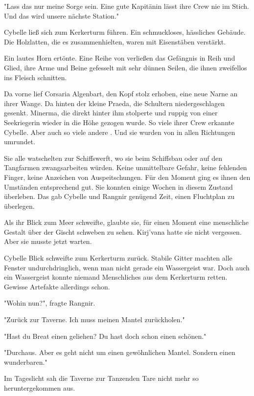"Lass das nur meine Sorge sein. Eine gute Kapitänin lässt ihre Crew nie im Stich. Und das wird unsere nächste Station."

Cybelle ließ sich zum Kerkerturm führen. Ein schmuckloses, hässliches Gebäude. Die Holzlatten, die es zusammenhielten, waren mit Eisenstäben verstärkt.

Ein lautes Horn ertönte. Eine Reihe von  verließen das Gefängnis in Reih und Glied, ihre Arme und Beine gefesselt mit sehr dünnen Seilen, die ihnen zweifellos ins Fleisch schnitten.

Da vorne lief Corsaria Algenbart, den Kopf stolz erhoben, eine neue Narne an ihrer Wange. Da hinten der kleine Praeda, die Schultern niedergeschlagen gesenkt. Minerma, die direkt hinter ihm stolperte und ruppig von einer Seekriegerin wieder in die Höhe gezogen wurde. So viele ihrer Crew erkannte Cybelle. Aber auch so viele andere . Und sie wurden von  in allen Richtungen umrundet. 

Sie alle watschelten zur Schiffswerft, wo sie beim Schiffsbau oder auf den Tangfarmen zwangsarbeiten würden. Keine unmittelbare Gefahr, keine fehlenden Finger, keine Anzeichen von Auspeitschungen. Für den Moment ging es ihnen den Umständen entsprechend gut. Sie konnten einige Wochen in diesem Zustand überleben. Das gab Cybelle und Rangnir genügend Zeit, einen Fluchtplan zu überlegen.

Als ihr Blick zum Meer schweifte, glaubte sie, für einen Moment eine menschliche Gestalt über der Gischt schweben zu sehen. Kirj'vana hatte sie nicht vergessen. Aber sie musste jetzt warten.

Cybelle Blick schweifte zum Kerkerturm zurück. Stabile Gitter machten alle Fenster undurchdringlich, wenn man nicht gerade ein Wassergeist war. Doch auch ein Wassergeist konnte niemand Menschliches aus dem Kerkerturm retten. Gewisse Artefakte allerdings schon.

"Wohin nun?", fragte Rangnir. 

"Zurück zur Taverne. Ich muss meinen Mantel zurückholen."

"Hast du Breat einen geliehen? Du hast doch schon einen schönen."

"Durchaus. Aber es geht nicht um einen gewöhnlichen Mantel. Sondern einen wunderbaren."

\trennzeichen

Im Tageslicht sah die Taverne zur Tanzenden Tare nicht mehr so heruntergekommen aus.

